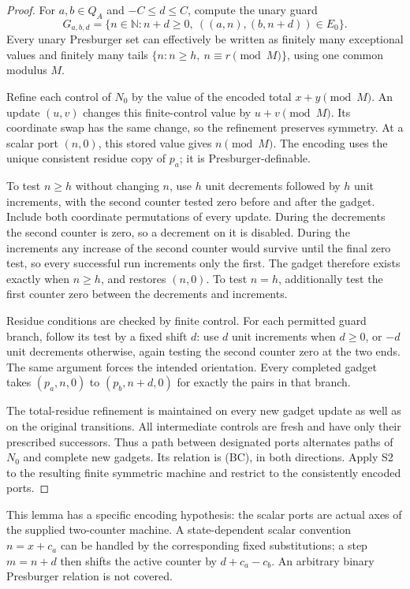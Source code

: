 \documentclass[11pt,a4paper]{article}
\theoremstyle{definition}
\theoremstyle{remark}
\newcommand{\N}{\mathbb N}
\begin{document}
\begin{proof}
For \(a,b\in Q_A\) and \(-C\le d\le C\), compute the unary guard
\[
 G_{a,b,d}=\{n\in\N:n+d\ge0,\
                     ((a,n),(b,n+d))\in E_0\}.
\]
Every unary Presburger set can effectively be written as finitely many
exceptional values and finitely many tails
\(\{n:n\ge h,\ n\equiv r\pmod M\}\), using one common modulus \(M\).

Refine each control of \(N_0\) by the value of the encoded total
\(x+y\pmod M\). An update \((u,v)\) changes this finite-control value
by \(u+v\pmod M\). Its coordinate swap has the same change, so the
refinement preserves symmetry. At a scalar port \((n,0)\), this
stored value gives \(n\pmod M\). The encoding uses the unique
consistent residue copy of \(p_a\); it is Presburger-definable.

To test \(n\ge h\) without changing \(n\), use \(h\) unit decrements
followed by \(h\) unit increments, with the second counter tested
zero before and after the gadget. Include both coordinate
permutations of every update. During the decrements the second
counter is zero, so a decrement on it is disabled. During the
increments any increase of the second counter would survive until
the final zero test, so every successful run increments only the
first. The gadget therefore exists exactly when \(n\ge h\), and
restores \((n,0)\). To test \(n=h\), additionally test the first
counter zero between the decrements and increments.

Residue conditions are checked by finite control. For each permitted
guard branch, follow its test by a fixed shift \(d\): use \(d\) unit
increments when \(d\ge0\), or \(-d\) unit decrements otherwise,
again testing the second counter zero at the two ends.
The same argument forces the intended orientation. Every completed
gadget takes \((p_a,n,0)\) to \((p_b,n+d,0)\) for exactly the pairs
in that branch.

The total-residue refinement is maintained on every new gadget
update as well as on the original transitions.
All intermediate controls are fresh and have only their prescribed
successors. Thus a path between designated ports alternates paths
of \(N_0\) and complete new gadgets. Its relation is (BC), in both
directions. Apply S2 to the resulting finite symmetric machine and
restrict to the consistently encoded ports.
\end{proof}

This lemma has a specific encoding hypothesis: the scalar ports are
actual axes of the supplied two-counter machine.
A state-dependent scalar convention \(n=x+c_a\) can be handled by
the corresponding fixed substitutions; a step \(m=n+d\) then shifts
the active counter by \(d+c_a-c_b\).
An arbitrary binary Presburger relation is not covered.
\end{document}
